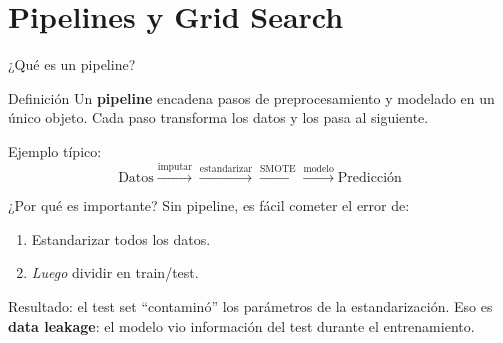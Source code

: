 \documentclass[aspectratio=169]{beamer}
\begin{document}
\section{Pipelines y Grid Search}

\begin{frame}{¿Qué es un pipeline?}
  \begin{block}{Definición}
    Un \textbf{pipeline} encadena pasos de preprocesamiento y modelado en un único objeto.
    Cada paso transforma los datos y los pasa al siguiente.
  \end{block}

  \medskip
  Ejemplo típico:
  \[
    \text{Datos} \xrightarrow{\text{imputar}} \xrightarrow{\text{estandarizar}} \xrightarrow{\text{SMOTE}} \xrightarrow{\text{modelo}} \text{Predicción}
  \]

  \medskip
  \begin{exampleblock}{¿Por qué es importante?}
    Sin pipeline, es fácil cometer el error de:
    \begin{enumerate}
      \item Estandarizar todos los datos.
      \item \textit{Luego} dividir en train/test.
    \end{enumerate}
    Resultado: el test set ``contaminó'' los parámetros de la estandarización.
    Eso es \textbf{data leakage}: el modelo vio información del test durante el entrenamiento.
  \end{exampleblock}
\end{frame}
\end{document}
